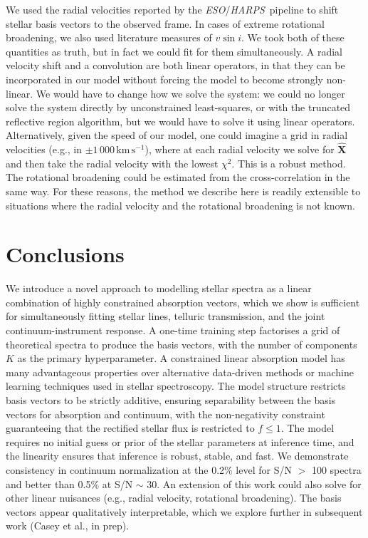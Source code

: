 \documentclass[modern,linenumbers]{aastex631}
\newcommand{\project}[1]{\textit{#1}}
\renewcommand{\vec}[1]{\mathbf{#1}}
\newcommand{\eso}{\project{ESO}}
\newcommand{\harps}{\project{HARPS}}
\renewcommand{\added}[1]{#1}
\newcommand{\removed}[1]{}
\begin{document}
We used the radial velocities reported by the \eso/\harps\ pipeline to shift stellar basis vectors to the observed frame. In cases of extreme rotational broadening, we also used literature measures of $v\sin{i}$. We took both of these quantities as truth, but in fact we could fit for them simultaneously. A radial velocity shift and a convolution are both linear operators, in that they can be incorporated in our model without forcing the model to become strongly non-linear. We would have to change how we solve the system: we could no longer solve the system directly by unconstrained least-squares, or with the truncated reflective region algorithm, but we would have to solve it using linear operators. Alternatively, given the speed of our model, one could imagine a grid in radial velocities (e.g., in $\pm1\,000\,\mathrm{km}\,\mathrm{s}^{-1}$), where at each radial velocity we solve for $\vec{\hat{X}}$ and then take the radial velocity with the lowest $\chi^2$. This is a robust method. The rotational broadening could be estimated from the cross-correlation in the same way. For these reasons, the method we describe here is readily extensible to situations where the radial velocity and the rotational broadening is not known.\\


\section{Conclusions} \label{sec:conclusions}

We introduce a novel approach to modelling stellar spectra as a linear combination of highly constrained absorption vectors, which we show is sufficient for simultaneously fitting stellar lines, telluric transmission, and the joint continuum-instrument response. \added{A one-time training step factorises a grid of theoretical spectra to produce the basis vectors, with the number of components $K$ as the primary hyperparameter.} A constrained linear absorption model has many advantageous properties over alternative data-driven methods or machine learning techniques used in stellar spectroscopy. The model structure restricts basis vectors to be strictly additive, ensuring separability between the basis vectors for absorption and continuum\added{, with the non-negativity constraint guaranteeing that the rectified stellar flux is restricted to $f \leq 1$}. The model requires no initial guess or prior of the stellar parameters \added{at inference time}, and the linearity ensures that inference is robust, stable, and fast. \added{We demonstrate consistency in continuum normalization at the 0.2\% level for S/N $>$ 100 spectra and better than 0.5\% at S/N $\sim$ 30.} An extension of this work could also solve for other linear nuisances (e.g., radial velocity, rotational broadening). \removed{Finally, an unexpected result of this work is that the basis vectors found from factorising model rectified spectra appear to be highly interpretable, which is promising for their use for interpretable constrained linear absorption models.} \added{The basis vectors appear qualitatively interpretable, which we explore further in subsequent work (Casey et al., in prep).}\\
\end{document}
